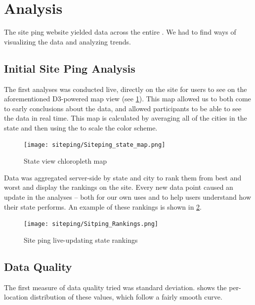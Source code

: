 \section{Analysis}\label{sec:results_web_ping}
The site ping website yielded data across the entire \us. We had to find ways of visualizing the data and analyzing trends.

\subsection{Initial Site Ping Analysis}

The first analyses was conducted live, directly on the site for users to see on the aforementioned D3-powered map view (see \cref{fig:siteping_state_view}). This map allowed us to both come to early conclusions about the data, and allowed participants to be able to see the data in real time. This map is calculated by averaging all of the cities in the state and then using the \iqr to scale the color scheme. 

\begin{figure}[hb]
    \centering
    \texttt{[image: siteping/Siteping\_state\_map.png]}
    \caption{State view chloropleth map}
    \label{fig:siteping_state_view}
\end{figure}

Data was aggregated server-side by state and city to rank them from best and worst and display the rankings on the site. Every new data point caused an update in the analyses -- both for our own uses and to help users understand how their state performs. An example of these rankings is shown in \cref{fig:siteping_rankings}.

\begin{figure}[htb]
    \centering
    \texttt{[image: siteping/Sitping\_Rankings.png]}
    \caption{Site ping live-updating state rankings}
    \label{fig:siteping_rankings}
\end{figure}

\subsection{Data Quality}

The first measure of data quality tried was standard deviation.  shows the per-location distribution of these values, which follow a fairly smooth curve.

